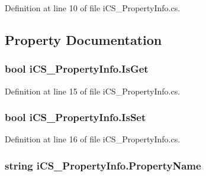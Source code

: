 Definition at line 10 of file i\+C\+S\+\_\+\+Property\+Info.\+cs.



\subsection{Property Documentation}
\hypertarget{classi_c_s___property_info_ace562b927e90485d7eb5eeed1a23370d}{
\subsubsection[{Is\+Get}]{\setlength{\rightskip}{0pt plus 5cm}bool i\+C\+S\+\_\+\+Property\+Info.\+Is\+Get\hspace{0.3cm}{\ttfamily [get]}}}\label{classi_c_s___property_info_ace562b927e90485d7eb5eeed1a23370d}


Definition at line 15 of file i\+C\+S\+\_\+\+Property\+Info.\+cs.

\hypertarget{classi_c_s___property_info_aae3c745bfb9df05299356ef61f2e482b}{
\subsubsection[{Is\+Set}]{\setlength{\rightskip}{0pt plus 5cm}bool i\+C\+S\+\_\+\+Property\+Info.\+Is\+Set\hspace{0.3cm}{\ttfamily [get]}}}\label{classi_c_s___property_info_aae3c745bfb9df05299356ef61f2e482b}


Definition at line 16 of file i\+C\+S\+\_\+\+Property\+Info.\+cs.

\hypertarget{classi_c_s___property_info_ae5b920ea87a7b5f55877671d19c37053}{
\subsubsection[{Property\+Name}]{\setlength{\rightskip}{0pt plus 5cm}string i\+C\+S\+\_\+\+Property\+Info.\+Property\+Name\hspace{0.3cm}{\ttfamily [get]}}}\label{classi_c_s___property_info_ae5b920ea87a7b5f55877671d19c37053}


